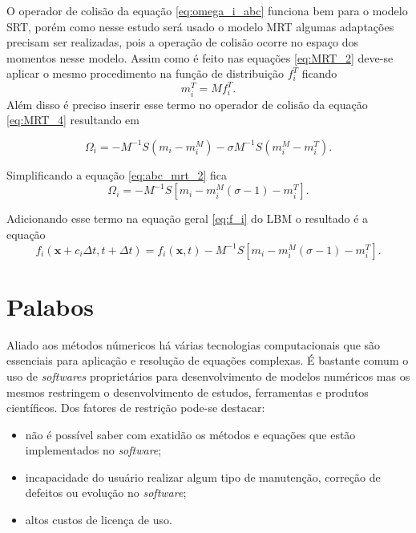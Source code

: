 O operador de colisão da equação \ref{eq:omega_i_abc} funciona bem para o modelo SRT, porém como nesse estudo será usado o modelo MRT algumas adaptações precisam ser realizadas, pois a operação de colisão ocorre no espaço dos momentos nesse modelo. Assim como é feito nas equações \ref{eq:MRT_2} deve-se aplicar o mesmo procedimento na função de distribuição $f_{i}^{T}$ ficando
\begin{equation}
  m_{i}^{T} = \textbf{$M$}f_{i}^{T}.
  \label{eq:abc_mrt_1}
\end{equation}
Além disso é preciso inserir esse termo no operador de colisão da equação \ref{eq:MRT_4} resultando em 

\begin{equation}
  \Omega_{i} = -\textbf{$M$}^{-1}\textbf{$S$}(m_{i} - m_{i}^{M}) - 
  \sigma\textbf{$M$}^{-1}\textbf{$S$}(m_{i}^{M} - m_{i}^{T}).
  \label{eq:abc_mrt_2}
\end{equation}

Simplificando a equação \ref{eq:abc_mrt_2} fica
\begin{equation}
  \Omega_{i} = -\textbf{$M$}^{-1}\textbf{$S$}[m_{i} - m_{i}^{M}(\sigma - 1) - m_{i}^{T}].
  \label{eq:abc_mrt_3}
\end{equation}

Adicionando esse termo na equação geral \ref{eq:f_i} do LBM o resultado é a equação
\begin{equation}
  f_{i}(\textbf{x} + c_{i}\Delta t, t + \Delta t) = f_{i}(\textbf{x}, t) -\textbf{$M$}^{-1}\textbf{$S$}[m_{i} - m_{i}^{M}(\sigma - 1) - m_{i}^{T}].
  \label{eq:abc_mrt_4}  
\end{equation}

\section{Palabos}

Aliado aos métodos númericos há várias tecnologias computacionais que são essenciais para aplicação e resolução de equações complexas. É bastante comum o uso de \textit{softwares} proprietários para desenvolvimento de modelos numéricos mas os mesmos restringem o desenvolvimento de estudos, ferramentas e produtos científicos. Dos fatores de restrição pode-se destacar:

\begin{itemize}
  \item não é possível saber com exatidão os métodos e equações que estão implementados no \textit{software};
  \item incapacidade do usuário realizar algum tipo de manutenção, correção de defeitos ou evolução no \textit{software};
  \item altos custos de licença de uso. 
\end{itemize}

